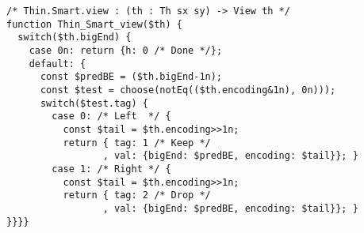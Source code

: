 


\begin{verbatim}
/* Thin.Smart.view : (th : Th sx sy) -> View th */
function Thin_Smart_view($th) {
  switch($th.bigEnd) {
    case 0n: return {h: 0 /* Done */};
    default: {
      const $predBE = ($th.bigEnd-1n);
      const $test = choose(notEq(($th.encoding&1n), 0n)));
      switch($test.tag) {
        case 0: /* Left  */ {
          const $tail = $th.encoding>>1n;
          return { tag: 1 /* Keep */
                 , val: {bigEnd: $predBE, encoding: $tail}}; }
        case 1: /* Right */ {
          const $tail = $th.encoding>>1n;
          return { tag: 2 /* Drop */
                 , val: {bigEnd: $predBE, encoding: $tail}}; }
}}}}
\end{verbatim}
